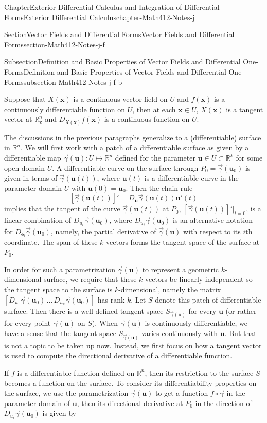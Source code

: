 \documentclass[oneside,10pt,]{book}
\numberwithin{equation}{section}
\newcommand{\be}{\mathbf{e}}
\newcommand{\bu}{\mathbf{u}}
\newcommand{\bx}{\mathbf{x}}
\newcommand{\bbR}{\mathbb{R}}
\newcommand{\vg}{{\vec{\gamma}}}
\begin{document}
\begin{chapterptx}{Chapter}{Exterior Differential Calculus and Integration of Differential Forms}{}{Exterior Differential Calculus}{}{}{chapter-Math412-Notes-j}
\begin{sectionptx}{Section}{Vector Fields and Differential Forms}{}{Vector Fields and Differential Forms}{}{}{section-Math412-Notes-j-f}
\begin{subsectionptx}{Subsection}{Definition and Basic Properties of Vector Fields and Differential One-Forms}{}{Definition and Basic Properties of Vector Fields and Differential One-Forms}{}{}{subsection-Math412-Notes-j-f-b}
\par
Suppose that \(X(\bx)\) is a continuous vector field on \(U\) and \(f(\bx)\) is a continuously differentiable function on \(U\), then at each \(\bx\in U\), \(X(\bx)\) is a tangent vector at \(\bbR^{n}_{\bx}\) and \(D_{X(\bx)}f(\bx)\) is a continuous function on \(U\).%
\par
The discussions in the previous paragraphs generalize to a (differentiable) surface in \({\mathbb R}^{n}\). We will first work with a patch of a differentiable surface as given by a differentiable map \(\vg (\bu): U\mapsto {\mathbb R}^{n}\) defined for the parameter \(\bu\in U \subset \bbR^{k}\) for some open domain \(U\). A differentiable curve on the surface through \(P_{0}=\vg(\bu_{0})\) is given in terms of \(\vg(\bu(t))\), where \(\bu(t)\) is a differentiable curve in the parameter domain \(U\) with \(\bu(0)=\bu_{0}\). Then the chain rule%
\begin{equation*}
\left[ \vg(\bu(t)) \right]' =D_{\bu}\vg(\bu(t)) \bu'(t)
\end{equation*}
implies that the tangent of the curve \(\vg(\bu(t))\) at \(P_{0}\), \(\left[ \vg(\bu(t)) \right]'|_{t=0}\), is a linear combination of \(D_{u_{i}}\vg(\bu_0)\), where \(D_{u_{i}}\vg(\bu_0)\) is an alternative notation for \(D_{\be_{i}}\vg(\bu_0)\), namely, the partial derivative of \(\vg(\bu)\) with respect to its \(i\)th coordinate. The span of these \(k\) vectors forms the tangent space of the surface at \(P_{0}\).%
\par
In order for such a parametrization \(\vg(\bu)\) to represent a geometric \(k\)-dimensional surface, we  require that these \(k\) vectors be linearly independent so the tangent space to the surface is \(k\)-dimensional, namely the matrix \([D_{u_{1}}\vg(\bu_0)\, \ldots\, D_{u_{k}}\vg(\bu_0)]\) has rank \(k\). Let \(S\) denote this patch of differentiable surface. Then there is a well defined tangent space \(S_{\vg(\bu)}\) for every \(\bu\) (or rather for every point \(\vg(\bu)\) on \(S\)). When \(\vg(\bu)\) is continuously differentiable, we have a sense that the tangent space \(S_{\vg(\bu)}\) varies continuously with \(\bu\). But that is not a topic to be taken up now. Instead, we first focus on how a tangent vector is used to compute the directional derivative of a differentiable function.%
\par
If \(f\) is a differentiable function defined on \(\bbR^{n}\), then its restriction to the surface \(S\) becomes a function on the surface. To consider its differentiability properties on the surface, we use the parametrization \(\vg(\bu)\) to get a function \(f\circ \vg\) in the parameter domain of \(\bu\), then its directional derivative at \(P_{0}\) in the direction of \(D_{u_{i}}\vg(\bu_0)\) is given by%

\end{subsectionptx}
\end{sectionptx}
\end{chapterptx}
\end{document}
